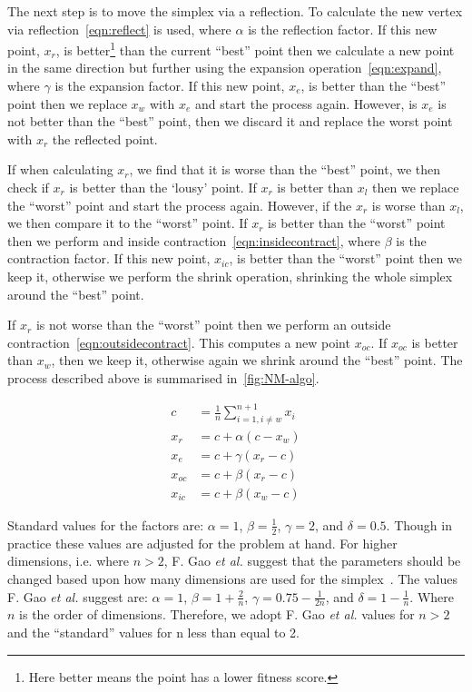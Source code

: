 The next step is to move the simplex via a reflection.
To calculate the new vertex via reflection~\cref{eqn:reflect} is used, where $\alpha$ is the reflection factor.
If this new point, $x_r$, is better\footnote{Here better means the point has a lower fitness score.} than the current ``best'' point then we calculate a new point in the same direction but further using the expansion operation~\cref{eqn:expand}, where $\gamma$ is the expansion factor.
If this new point, $x_e$, is better than the ``best'' point then we replace $x_w$ with $x_e$ and start the process again.
However, is $x_e$ is not better than the ``best'' point, then we discard it and replace the worst point with $x_r$ the reflected point.

If when calculating $x_r$, we find that it is worse than the ``best'' point, we then check if $x_r$ is better than the `lousy' point.
If $x_r$ is better than $x_l$ then we replace the ``worst'' point and start the process again.
However, if the $x_r$ is worse than $x_l$, we then compare it to the ``worst'' point.
If $x_r$ is better than the ``worst'' point then we perform and inside contraction~\cref{eqn:insidecontract}, where $\beta$ is the contraction factor.
If this new point, $x_{ic}$, is better than the ``worst'' point then we keep it, otherwise we perform the shrink operation, shrinking the whole simplex around the ``best'' point.

If $x_r$ is not worse than the ``worst'' point then we perform an outside contraction~\cref{eqn:outsidecontract}.
This computes a new point $x_{oc}$.
If $x_{oc}$ is better than $x_w$, then we keep it, otherwise again we shrink around the ``best'' point.
The process described above is summarised in~\cref{fig:NM-algo}.

\begin{align}
c &= \frac{1}{n}\sum \limits_{i=1,i\neq w}^{n+1} x_i \label{eqn:centroid}\\
x_r &= c + \alpha(c - x_w)\label{eqn:reflect}\\
x_e &= c + \gamma(x_r - c)\label{eqn:expand}\\
x_{oc} &= c + \beta(x_r - c)\label{eqn:outsidecontract}\\
x_{ic} &= c + \beta(x_w - c)\label{eqn:insidecontract}
\end{align}

Standard values for the factors are: $\alpha=1$, $\beta=\frac{1}{2}$, $\gamma=2$, and $\delta=0.5$.
Though in practice these values are adjusted for the problem at hand.
For higher dimensions, i.e. where $n > 2$, F. Gao \textit{et al.} suggest that the parameters should be changed based upon how many dimensions are used for the simplex~\cite{gao2012implementing}.
The values F. Gao \textit{et al.} suggest are: $\alpha=1$, $\beta=1+\tfrac{2}{n}$, $\gamma=0.75-\tfrac{1}{2n}$, and $\delta=1-\tfrac{1}{n}$.
Where $n$ is the order of dimensions.
Therefore, we adopt F. Gao \textit{et al.} values for $n>2$ and the ``standard'' values for n less than equal to 2.

